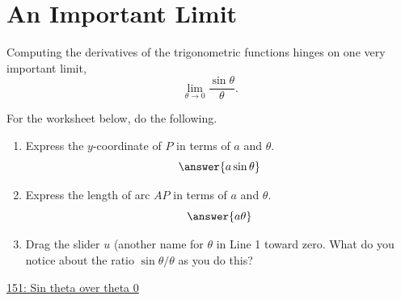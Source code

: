 \documentclass{ximera}
\begin{document}
\section{An Important Limit}
Computing the derivatives of the trigonometric functions hinges on one very important limit,
\[
 \lim_{\theta\to 0} \frac{\sin\theta}{\theta}.
\]

\begin{example} \label{ExMf2121}

For the worksheet below, do the following.
\begin{enumerate}
\item Express the $y$-coordinate of $P$ in terms of $a$ and $\theta$.
\[
    \answer{a\sin\theta}
\]

\item Express the length of arc $AP$ in terms of $a$ and $\theta$.
\[
    \answer{a\theta} 
\]

\item Drag the slider $u$ (another name for $\theta$ in Line 1 toward zero. What do you notice about the ratio $\sin\theta/\theta$ as you do this?
\begin{freeResponse}
\end{freeResponse}
\end{enumerate}

\begin{onlineOnly}
    \begin{center}
\end{center}
\end{onlineOnly}

\href{https://www.desmos.com/calculator/2ocbmfdt5r}{151: Sin theta over theta 0}


\end{example}
\end{document}
